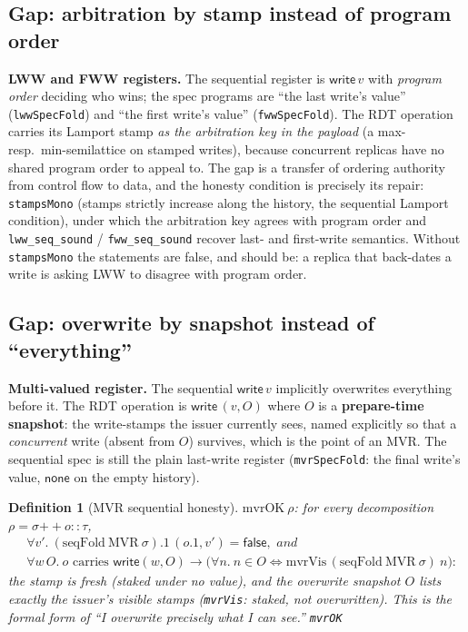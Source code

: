 \documentclass[11pt]{article}
\newtheorem{definition}[theorem]{Definition}
\newcommand{\lean}[1]{\texttt{#1}}
\newcommand{\code}[1]{\texttt{#1}}
\begin{document}
\subsection{Gap: arbitration by stamp instead of program order}

\textbf{LWW and FWW registers.} The sequential register is
$\mathsf{write}\,v$ with \emph{program order} deciding who wins; the
spec programs are ``the last write's value'' (\code{lwwSpecFold}) and
``the first write's value'' (\code{fwwSpecFold}). The RDT operation
carries its Lamport stamp \emph{as the arbitration key in the payload}
(a max- resp.\ min-semilattice on stamped writes), because concurrent
replicas have no shared program order to appeal to. The gap is a
transfer of ordering authority from control flow to data, and the
honesty condition is precisely its repair: \code{stampsMono} (stamps
strictly increase along the history, the sequential Lamport
condition), under which the arbitration key agrees with program order
and \code{lww\_seq\_sound} / \code{fww\_seq\_sound} recover last- and
first-write semantics. Without \code{stampsMono} the statements are
false, and should be: a replica that back-dates a write is asking LWW
to disagree with program order.

\subsection{Gap: overwrite by snapshot instead of ``everything''}

\textbf{Multi-valued register.} The sequential $\mathsf{write}\,v$
implicitly overwrites everything before it. The RDT operation is
$\mathsf{write}\,(v, O)$ where $O$ is a \textbf{prepare-time
snapshot}: the write-stamps the issuer currently sees, named
explicitly so that a \emph{concurrent} write (absent from $O$)
survives, which is the point of an MVR. The sequential spec is still
the plain last-write register (\code{mvrSpecFold}: the final write's
value, $\mathsf{none}$ on the empty history).

\begin{definition}[MVR sequential honesty]
\label{def:mvrok}
$\mathrm{mvrOK}\ \rho$: for every decomposition
$\rho = \sigma \mathbin{+\!\!+} o :: \tau$,
\[
\begin{aligned}
  &\forall v'.\ (\mathrm{seqFold}\ \mathrm{MVR}\ \sigma).1\,
    (o.1, v') = \mathsf{false} , \textit{ and} \\
  &\forall w\, O.\ o \text{ carries } \mathsf{write}(w, O) \to
    \bigl(\forall n.\ n \in O \iff
    \mathrm{mvrVis}\,(\mathrm{seqFold}\ \mathrm{MVR}\ \sigma)\ n
    \bigr) :
\end{aligned}
\]
the stamp is fresh (staked under no value), and the overwrite
snapshot $O$ lists \emph{exactly} the issuer's visible stamps
(\lean{mvrVis}: staked, not overwritten). This is the formal form of
``I overwrite precisely what I can see.''
\hfill\lean{mvrOK}
\end{definition}
\end{document}
